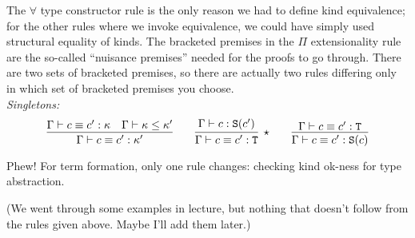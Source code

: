 The $\forall$ type constructor rule is the only reason we had to define kind equivalence; for the
other rules where we invoke equivalence, we could have simply used structural equality of kinds.
The bracketed premises in the $\Pi$ extensionality rule are the so-called ``nuisance premises''
needed for the proofs to go through. There are two sets of bracketed premises, so there are
actually two rules differing only in which set of bracketed premises you choose.\\

\noindent\emph{Singletons:}
\[
  \infer{\Gamma \vdash c \equiv c' : \kappa'}
    {\Gamma \vdash c \equiv c' : \kappa
    &\Gamma \vdash \kappa \le \kappa'
    }
  \qquad
  \infer[\star]{\Gamma \vdash c \equiv c' : \T}{\Gamma \vdash c : \S(c')}
  \qquad
  \infer{\Gamma \vdash c \equiv c' : \S(c)}{\Gamma \vdash c \equiv c' : \T}
\]

Phew!
For term formation, only one rule changes: checking kind ok-ness for
type abstraction.

(We went through some examples in lecture, but nothing that doesn't follow from the rules
given above. Maybe I'll add them later.)

